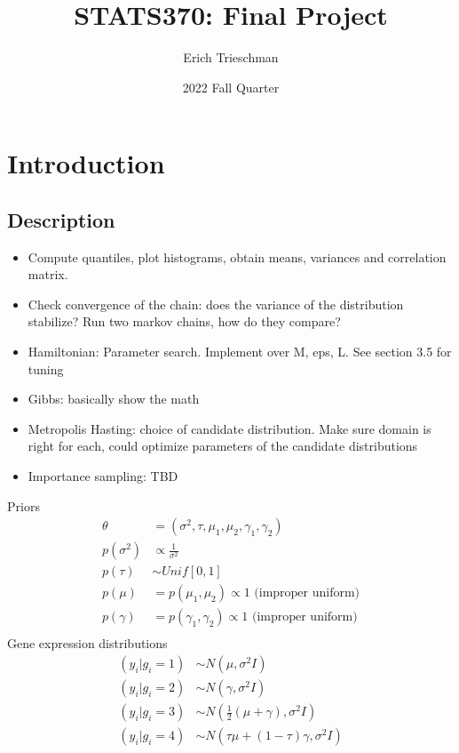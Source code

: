 \documentclass{article}
\title{STATS370: Final Project}
\author{Erich Trieschman}
\date{2022 Fall Quarter}
\begin{document}
\maketitle


\section{Introduction}
\subsection{Description}
\begin{itemize}
  \item Compute quantiles, plot histograms, obtain means, variances and correlation matrix.
  \item Check convergence of the chain: does the variance of the distribution stabilize? Run two markov chains, how do they compare?
  \item Hamiltonian: Parameter search. Implement over M, eps, L. See section 3.5 for tuning
  \item Gibbs: basically show the math
  \item Metropolis Hasting: choice of candidate distribution. Make sure domain is right for each, could optimize parameters of the candidate distributions
  \item Importance sampling: TBD
\end{itemize}
Priors
\begin{align*}
  \theta &= (\sigma^2, \tau, \mu_1, \mu_2, \gamma_1, \gamma_2)\\
  p(\sigma^2) &\propto \frac{1}{\sigma^2}\\
  p(\tau) &\sim Unif[0, 1]\\
  p(\mu) &= p(\mu_1, \mu_2) \propto 1 \textrm{ (improper uniform)}\\
  p(\gamma) &= p(\gamma_1, \gamma_2) \propto 1 \textrm{ (improper uniform)}\\
\end{align*}
Gene expression distributions
\begin{align*}
  (y_i | g_i = 1) &\sim N(\mu, \sigma^2 I)\\
  (y_i | g_i = 2) &\sim N(\gamma, \sigma^2 I)\\
  (y_i | g_i = 3) &\sim N(\frac{1}{2}(\mu + \gamma), \sigma^2 I)\\
  (y_i | g_i = 4) &\sim N(\tau\mu + (1-\tau)\gamma, \sigma^2 I)
\end{align*}
\end{document}
